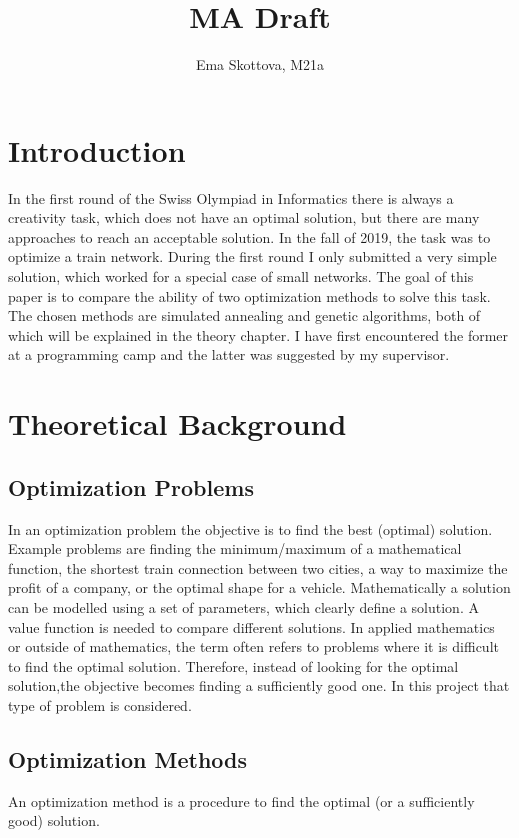 \documentclass[10pt]{report}
\title{MA Draft}
\author{Ema Skottova, M21a}
\begin{document}
\maketitle

\tableofcontents

\chapter{Introduction}
In the first round of the Swiss Olympiad in Informatics there is always a creativity task, which does not have an optimal solution, but there are many approaches to reach an acceptable solution. In the fall of 2019, the task was to optimize a train network. During the first round I only submitted a very simple solution, which worked for a special case of small networks. The goal of this paper is to compare the ability of two optimization methods to solve this task. The chosen methods are simulated annealing and genetic algorithms, both of which will be explained in the theory chapter. I have first encountered the former at a programming camp and the latter was suggested by my supervisor.


\chapter{Theoretical Background}

\section{Optimization Problems}
In an optimization problem the objective is to find the best (optimal) solution. Example problems are finding the minimum/maximum of a mathematical function, the shortest train connection between two cities, a way to maximize the profit of a company, or the optimal shape for a vehicle. Mathematically a solution can be modelled using a set of parameters, which clearly define a solution. A value function is needed to compare different solutions. In applied mathematics or outside of mathematics, the term often refers to problems where it is difficult to find the optimal solution. Therefore, instead of looking for the optimal solution,the objective becomes finding a sufficiently good one. In this project that type of problem is considered.

\section{Optimization Methods}
An optimization method is a procedure to find the optimal (or a sufficiently good) solution. 
\end{document}
